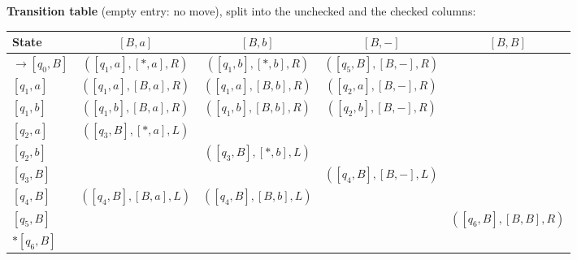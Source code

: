 \documentclass[11pt,a4paper]{article}
\begin{document}
\begin{solution}
{}
\textbf{Transition table} (empty entry: no move), split into the unchecked and the checked columns:
\begin{center}\small\begin{tabular}{l|cccc}\toprule
State & $[B,a]$ & $[B,b]$ & $[B,-]$ & $[B,B]$\\\midrule
$\to[q_0,B]$ & $([q_1,a],[\ast,a],R)$ & $([q_1,b],[\ast,b],R)$ & $([q_5,B],[B,-],R)$ & \\
$[q_1,a]$ & $([q_1,a],[B,a],R)$ & $([q_1,a],[B,b],R)$ & $([q_2,a],[B,-],R)$ & \\
$[q_1,b]$ & $([q_1,b],[B,a],R)$ & $([q_1,b],[B,b],R)$ & $([q_2,b],[B,-],R)$ & \\
$[q_2,a]$ & $([q_3,B],[\ast,a],L)$ & & & \\
$[q_2,b]$ & & $([q_3,B],[\ast,b],L)$ & & \\
$[q_3,B]$ & & & $([q_4,B],[B,-],L)$ & \\
$[q_4,B]$ & $([q_4,B],[B,a],L)$ & $([q_4,B],[B,b],L)$ & & \\
$[q_5,B]$ & & & & $([q_6,B],[B,B],R)$\\
$*[q_6,B]$ & & & & \\\bottomrule\end{tabular}


\end{center}
\end{solution}
\end{document}
